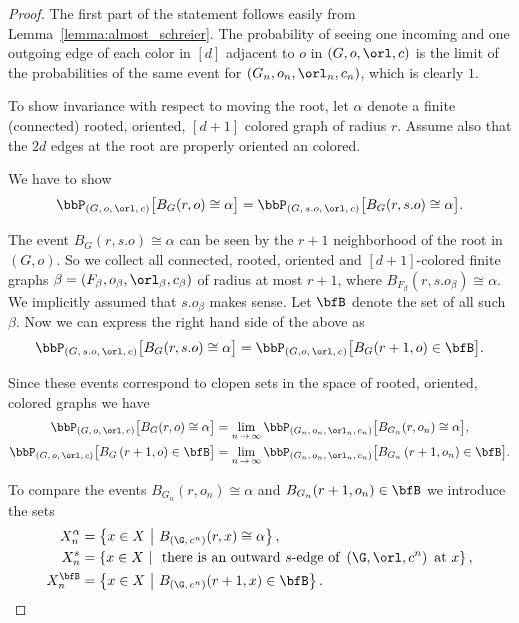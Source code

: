 \begin{proof}
The first part of the statement follows easily from Lemma~\ref{lemma:almost_schreier}. The probability of seeing one incoming and one outgoing edge of each color in $[d]$ adjacent to $o$ in $(G,o,\orl, c)$ is the limit of the probabilities of the same event for $(G_n,o_n,\orl_n,c_n)$, which is clearly $1$.

To show invariance with respect to moving the root, let $\alpha$ denote a finite (connected) rooted, oriented, $[d+1]$ colored graph of radius $r$. Assume also that the $2d$ edges at the root are properly oriented an colored.

We have to show
\[
\bbP_{\left(G,\,o,\,\orl,\,c\right)}\big[B_G(r,o) \cong \alpha\big] = \bbP_{\left(G,\,s.o,\,\orl,\,c\right)}\big[B_G(r,s.o) \cong \alpha\big].
\]

The event $B_G(r,s.o) \cong \alpha$ can be seen by the $r+1$ neighborhood of the root in $(G,o)$. So we collect all connected, rooted, oriented and $[d+1]$-colored finite graphs $\beta=(F_{\beta},o_{\beta},\orl_{\beta}, c_{\beta})$ of radius at most $r+1$, where $B_{F_{\beta}}(r,s.o_{\beta}) \cong \alpha$. We implicitly assumed that $s.o_{\beta}$ makes sense. Let $\bfB$ denote the set of all such $\beta$. Now we can express the right hand side of the above as
\[
\bbP_{\left(G,\,s.o,\,\orl,\,c\right)}\big[B_G(r,s.o) \cong \alpha\big] = \bbP_{\left(G,o,\,\orl,\,c\right)}\big[B_G(r+1,o) \in \bfB\big].
\]

Since these events correspond to clopen sets in the space of rooted, oriented, colored graphs we have
\begin{align*}
\bbP_{\left(G,\,o,\,\orl,\,c\right)}\big[B_G(r,o) \cong \alpha\big] &= \lim_{n\,\to\,\infty} \bbP_{\left(G_n,\,o_n,\,\orl_n,\,c_n\right)}\big[B_{G_n}(r,o_n) \cong \alpha\big],
\\
\bbP_{\left(G,\,o,\,\orl,\,c\right)}\big[B_G\left(r+1,o\right) \in \bfB\big] &=
\lim_{n\,\to\,\infty}
\bbP_{\left(G_n,\,o_n,\,\orl_n,\,c_n\right)}\big[B_{G_n}\left(r+1,o_n\right) \in \bfB\big].
\end{align*}

To compare the events $B_{G_n}(r,o_n) \cong \alpha$ and $B_{G_n}(r+1,o_n) \in \bfB$ we introduce the sets
\begin{align*}
X^{\alpha}_{n}&=\left\{x \in X~\middle|~B_{\left(\G,\,c^n\right)}(r,x) \cong \alpha\right\},
\\
X^s_n &=\left\{x \in X~\middle|~\text{ there is an outward $s$-edge of }\left(\G,\orl,c^n\right)\text{ at } x\right\},
\\
X^{\bfB}_{n} &=\left\{x \in X~\middle|~B_{\left(\G,\,c^n\right)}(r+1,x) \in \bfB\right\}.
\end{align*}


\end{proof}
